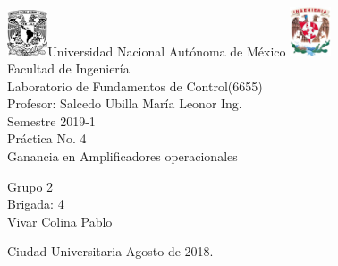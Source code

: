 

\begin{titlepage}
     \begin{center}
	\includegraphics[width=0.09\textwidth]{UNAM}\Large Universidad Nacional Autónoma de México
        	\includegraphics[width=0.09\textwidth]{FI}\\[1cm]
        \Large Facultad de Ingeniería\\[1cm]
         \Large Laboratorio de Fundamentos de Control(6655)\\[1cm]
         \footnotesize Profesor: Salcedo Ubilla María Leonor Ing.\\[1cm]
        \footnotesize Semestre 2019-1\\[1cm]
        
       

        \Large Práctica No. 4\\[1cm]
        
           

\Large Ganancia en Amplificadores operacionales
        
          \begin{flushright}
\footnotesize  Grupo 2\\[0.5cm]
\footnotesize Brigada: 4\\[0.5cm]
\footnotesize Vivar Colina Pablo\\[0.5cm]
 \end{flushright}
          \begin{flushleft}
        \footnotesize Ciudad Universitaria Agosto de 2018.\\
          \end{flushleft}
         
          
   \end{center}
\end{titlepage}
